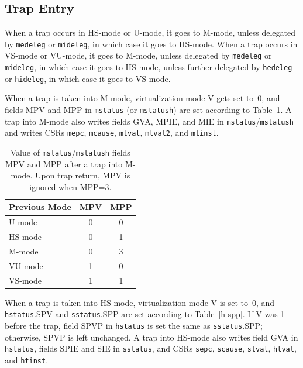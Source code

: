 \subsection{Trap Entry}

When a trap occurs in HS-mode or U-mode, it goes to M-mode, unless
delegated by {\tt medeleg} or {\tt mideleg}, in which case it goes to HS-mode.
When a trap occurs in VS-mode or VU-mode, it goes to M-mode, unless
delegated by {\tt medeleg} or {\tt mideleg}, in which case it goes to HS-mode,
unless further delegated by {\tt hedeleg} or {\tt hideleg}, in which case it
goes to VS-mode.

When a trap is taken into M-mode, virtualization mode V gets set to~0,
and fields MPV and MPP in {\tt mstatus}
(or {\tt mstatush}) are set according to
Table~\ref{h-mpp}.
A trap into M-mode also writes fields GVA, MPIE, and MIE in
{\tt mstatus}/{\tt mstatush} and writes CSRs {\tt mepc}, {\tt mcause},
{\tt mtval}, {\tt mtval2}, and {\tt mtinst}.

\begin{table}[h!]
\begin{center}
\begin{tabular}{|l|c|c|}
  \hline
  Previous Mode & MPV & MPP \\ \hline
  U-mode        & 0   & 0   \\
  HS-mode       & 0   & 1   \\
  M-mode        & 0   & 3   \\ \hline
  VU-mode       & 1   & 0   \\
  VS-mode       & 1   & 1   \\ \hline
\end{tabular}
\end{center}
\caption{Value of {\tt mstatus}/{\tt mstatush} fields MPV and MPP after a trap into M-mode.
Upon trap return, MPV is ignored when MPP=3.}
\label{h-mpp}
\end{table}

When a trap is taken into HS-mode, virtualization mode V is set to~0,
and {\tt hstatus}.SPV and {\tt sstatus}.SPP are
set according to Table~\ref{h-spp}.
If V was 1 before the trap, field SPVP in {\tt hstatus} is set the same as
{\tt sstatus}.SPP;
otherwise, SPVP is left unchanged.
A trap into HS-mode also writes field GVA in {\tt hstatus}, fields
SPIE and SIE in {\tt sstatus}, and CSRs {\tt sepc}, {\tt scause},
{\tt stval}, {\tt htval}, and {\tt htinst}.

